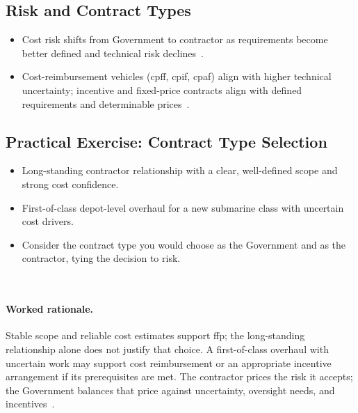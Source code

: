 \documentclass[../main.tex]{subfiles}
\begin{document}
\subsection{Risk and Contract Types}
\begin{itemize}
  \item Cost risk shifts from Government to contractor as requirements become better defined and technical risk declines~\autocite{edo-3-2-2-solicitation-prep-2025,FAR-16-103-Negotiating-Contract-Type,FAR-16-202-1-FFP,FAR-16-301-1-Cost-Reimbursement}.
  \item Cost-reimbursement vehicles (\ac{cpff}, \ac{cpif}, \ac{cpaf}) align with higher technical uncertainty; incentive and fixed-price contracts align with defined requirements and determinable prices~\autocite{edo-3-2-2-solicitation-prep-2025,FAR-16-103-Negotiating-Contract-Type,FAR-16-301-1-Cost-Reimbursement,FAR-16-401-Incentive-Contracts}.
\end{itemize}

\subsection{Practical Exercise: Contract Type Selection}
\begin{itemize}
  \item Long-standing contractor relationship with a clear, well-defined scope and strong cost confidence.
  \item First-of-class depot-level overhaul for a new submarine class with uncertain cost drivers.
  \item Consider the contract type you would choose as the Government and as the contractor, tying the decision to risk.
\end{itemize}
~

\paragraph{Worked rationale.} Stable scope and reliable cost estimates support \ac{ffp}; the long-standing relationship alone does not justify that choice. A first-of-class overhaul with uncertain work may support cost reimbursement or an appropriate incentive arrangement if its prerequisites are met. The contractor prices the risk it accepts; the Government balances that price against uncertainty, oversight needs, and incentives~\autocite{edo-3-2-2-solicitation-prep-2025,FAR-16-103-Negotiating-Contract-Type}.
\end{document}

